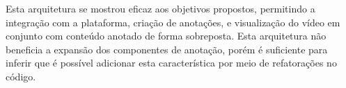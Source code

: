 Esta arquitetura se mostrou eficaz aos objetivos propostos, permitindo a integração com a plataforma, criação de anotações, e visualização do vídeo em conjunto com conteúdo anotado de forma sobreposta. Esta arquitetura não beneficia a expansão dos componentes de anotação, porém é suficiente para inferir que é possível adicionar esta característica por meio de refatorações no código. 